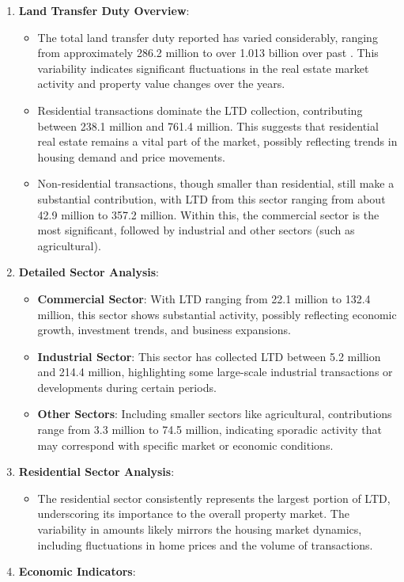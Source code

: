 \documentclass[11pt,a4paper,]{article}
\providecommand{\tightlist}{%
  \setlength{\itemsep}{0pt}\setlength{\parskip}{0pt}}
\begin{document}
\begin{enumerate}
\def\labelenumi{\arabic{enumi}.}
\tightlist
\item
  \textbf{Land Transfer Duty Overview}:

  \begin{itemize}
  \tightlist
  \item
    The total land transfer duty reported has varied considerably, ranging from approximately 286.2 million to over 1.013 billion over past . This variability indicates significant fluctuations in the real estate market activity and property value changes over the years.
  \item
    Residential transactions dominate the LTD collection, contributing between 238.1 million and 761.4 million. This suggests that residential real estate remains a vital part of the market, possibly reflecting trends in housing demand and price movements.
  \item
    Non-residential transactions, though smaller than residential, still make a substantial contribution, with LTD from this sector ranging from about 42.9 million to 357.2 million. Within this, the commercial sector is the most significant, followed by industrial and other sectors (such as agricultural).
  \end{itemize}
\item
  \textbf{Detailed Sector Analysis}:

  \begin{itemize}
  \tightlist
  \item
    \textbf{Commercial Sector}: With LTD ranging from 22.1 million to 132.4 million, this sector shows substantial activity, possibly reflecting economic growth, investment trends, and business expansions.
  \item
    \textbf{Industrial Sector}: This sector has collected LTD between 5.2 million and 214.4 million, highlighting some large-scale industrial transactions or developments during certain periods.
  \item
    \textbf{Other Sectors}: Including smaller sectors like agricultural, contributions range from 3.3 million to 74.5 million, indicating sporadic activity that may correspond with specific market or economic conditions.
  \end{itemize}
\item
  \textbf{Residential Sector Analysis}:

  \begin{itemize}
  \tightlist
  \item
    The residential sector consistently represents the largest portion of LTD, underscoring its importance to the overall property market. The variability in amounts likely mirrors the housing market dynamics, including fluctuations in home prices and the volume of transactions.
  \end{itemize}
\item
  \textbf{Economic Indicators}:


\end{enumerate}
\end{document}
